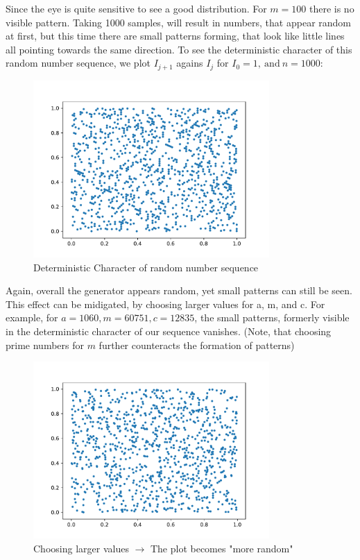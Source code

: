 \documentclass{article}
\begin{document}
Since the eye is quite sensitive to see a good distribution. For \( m = 100\) 
there is no visible pattern. Taking 1000 samples, will result in numbers, that
appear random at first, but this time there are small patterns forming, that
look like little lines all pointing towards the same direction.
To see the deterministic character of this random number sequence, we plot
\( I _{j + 1} \) agains \( I _{j} \) for \( I_0 = 1, \ \text{and} \ n = 1000 \):
\begin{figure}[H]
    \centering
    \includegraphics[width=9cm]{Fig1-3.pdf}
    \caption{Deterministic Character of random number sequence}
\end{figure}
Again, overall the generator appears random, yet small patterns can still be seen.
This effect can be midigated, by choosing larger values for a, m, and c.
For example, for \( a = 1060, m = 60751, c = 12835 \), the small patterns,
formerly visible in the deterministic character of our sequence vanishes. (Note,
that choosing prime numbers for \( m \) further counteracts the formation of
patterns)
\begin{figure}[H]
    \centering
    \includegraphics[width=9cm]{Fig1-4.pdf}
    \caption{Choosing larger values $\rightarrow$ The plot becomes "more random"}
\end{figure}
\end{document}
